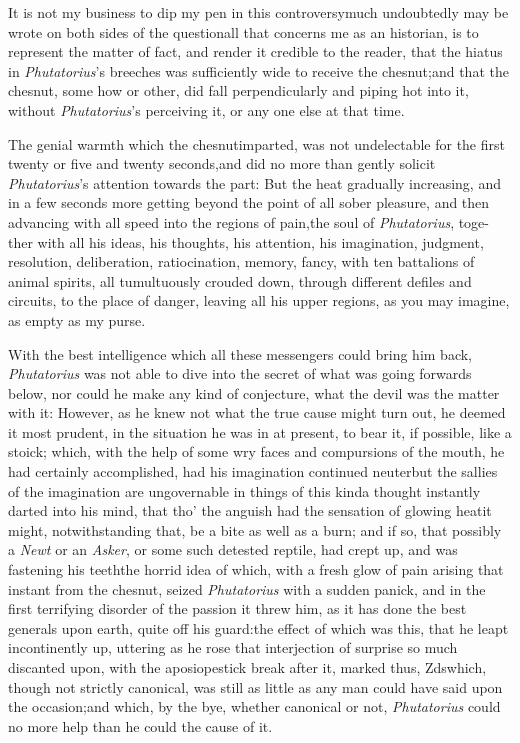 \documentclass{article}
\begin{document}
It is not my business to dip my pen in this
controversy\tsh much undoubtedly may be wrote on both
sides of the question\tsk all that concerns me as an historian,
is to represent the matter of fact, and render it credible to the
reader, that the hiatus in \textit{Phutatorius}’s breeches was
sufficiently wide to receive the ches\-nut;\break\tsh and that the
chesnut, some how or other, did fall perpendicularly and piping hot
into it, without \textit{Phutatorius}’s perceiving it, or any
one else at that time.

The genial warmth which the chesnut\break imparted, was not
undelectable for the first twenty or five and twenty
seconds,\tsk and did no more than gently solicit
\textit{Phu\-tatorius}’s attention towards the
part:\tsk\break
But the heat gradually increasing, and in a few
seconds more getting beyond the point of all sober pleasure, and
then advancing with all speed into the regions of pain,\tsk the soul of
\textit{Phutatorius}, toge- ther with all his ideas, his thoughts, his
attention, his imagination, judgment,\break
resolution, deliberation, ratiocination,\break
memory, fancy, with ten battalions of animal
spirits, all tumultuously crouded down, through different defiles
and circuits, to the place of danger, leaving all his upper
regions, as you may imagine, as empty as my purse.

With the best intelligence which all these messengers could
bring him back, \textit{Phutatorius} was not able to dive into the
secret of what was going forwards below, nor could he make any kind
of conjecture, what the devil was the matter with it: However, as
he knew not what the true cause might turn out, he deemed it most
prudent, in the situation he was in at present, to bear it,
if possible, like a stoick;
which, with the help of some
wry faces and compursions of the
mouth, he had certainly accomplished, had his imagination continued
neuter\tsh but the sallies of the imagination are
ungovernable in things of this kind\tsk a thought instantly
darted into his mind, that tho’ the anguish had the sensation
of glowing heat\tsk it might, notwithstanding that, be a bite as
well as a burn; and if so, that possibly a \textit{Newt} or an
\textit{Asker}, or some such detested reptile, had crept up, and was
fastening his teeth\tsh the horrid idea of which, with a
fresh glow of pain arising that instant from the chesnut, seized
\textit{Phutatorius} with a sudden panick, and in the first
terrifying disorder of the passion it threw him, as it has done
the best generals upon earth, quite off his guard:\tsk the
effect of which was this, that he leapt incontinently up, uttering
as he rose that interjection of surprise so much discanted upon,
with the apo\-sio\-pestick break after it, marked thus,\break
Z\tsh ds\tsk which, though not strictly canonical, was still as little as any man
could have said upon the occasion;\tsh\break and which,
by the bye, whether canonical or not, \textit{Phutatorius} could no
more help than he could the cause of it.
\end{document}
